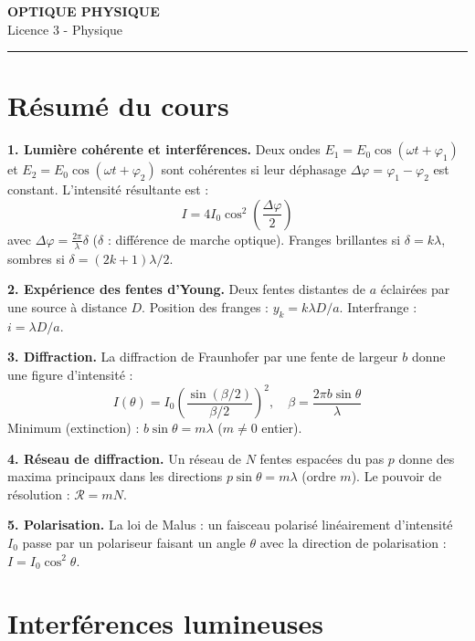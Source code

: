 \documentclass[12pt,a4paper]{article}
\begin{document}
\fi

\begin{center}
  {\LARGE\bfseries OPTIQUE PHYSIQUE}\\[0.3cm]
  {\normalsize Licence 3 - Physique}\\[0.1cm]
  \rule{0.7\textwidth}{0.8pt}
\end{center}

\section*{Résumé du cours}

\begin{boiteresume}

\textbf{1. Lumière cohérente et interférences.} Deux ondes $E_1 = E_0\cos(\omega t + \varphi_1)$ et $E_2 = E_0\cos(\omega t + \varphi_2)$ sont cohérentes si leur déphasage $\Delta\varphi = \varphi_1-\varphi_2$ est constant. L'intensité résultante est :
\[
I = 4I_0\cos^2\!\left(\frac{\Delta\varphi}{2}\right)
\]
avec $\Delta\varphi = \frac{2\pi}{\lambda}\delta$ ($\delta$ : différence de marche optique). Franges brillantes si $\delta = k\lambda$, sombres si $\delta = (2k+1)\lambda/2$.

\textbf{2. Expérience des fentes d'Young.} Deux fentes distantes de $a$ éclairées par une source à distance $D$. Position des franges : $y_k = k\lambda D/a$. Interfrange : $i = \lambda D/a$.

\textbf{3. Diffraction.} La diffraction de Fraunhofer par une fente de largeur $b$ donne une figure d'intensité :
\[
I(\theta) = I_0\left(\frac{\sin(\beta/2)}{\beta/2}\right)^2, \quad \beta = \frac{2\pi b\sin\theta}{\lambda}
\]
Minimum (extinction) : $b\sin\theta = m\lambda$ ($m\neq0$ entier).

\textbf{4. Réseau de diffraction.} Un réseau de $N$ fentes espacées du pas $p$ donne des maxima principaux dans les directions $p\sin\theta = m\lambda$ (ordre $m$). Le pouvoir de résolution : $\mathcal{R} = mN$.

\textbf{5. Polarisation.} La loi de Malus : un faisceau polarisé linéairement d'intensité $I_0$ passe par un polariseur faisant un angle $\theta$ avec la direction de polarisation : $I = I_0\cos^2\theta$.

\end{boiteresume}

\newpage
\section{Interférences lumineuses}
\end{document}
